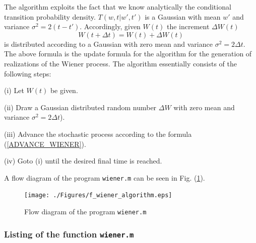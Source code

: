 The algorithm exploits the fact that we know analytically the
conditional transition probability density. $T(w,t|w',t')$ is a 
Gaussian  with  mean $w'$ and variance $\sigma^2=2(t-t')$.
Accordingly, given $W(t)$ the increment $\Delta W(t)$
\begin{equation}
\label{ADVANCE_WIENER}
W(t+\Delta t) = W(t) + \Delta W(t)
\end{equation}
is distributed according to a Gaussian with zero mean and variance
$\sigma^2=2\Delta t$. The above formula is the update formula
for the algorithm for the generation of realizations of the Wiener
process. The algorithm essentially consists of the following 
steps:

(i) Let $W(t)$ be given.

(ii) Draw a Gaussian distributed random number $\Delta W$
with zero mean and variance $\sigma^2=2\Delta t$).

(iii) Advance the stochastic process according to the formula
(\ref{ADVANCE_WIENER}).

(iv) Goto (i) until the desired final time is reached.

A flow diagram of the program \texttt{wiener.m} can be seen in 
Fig. (\ref{F_WIENER_ALGORITHM}). 
\begin{figure}
\label{F_WIENER_ALGORITHM}
\texttt{[image: ./Figures/f\_wiener\_algorithm.eps]}
\caption{Flow diagram of the program \texttt{wiener.m}}
\end{figure}
\subsubsection{Listing of the function \texttt{wiener.m}}

